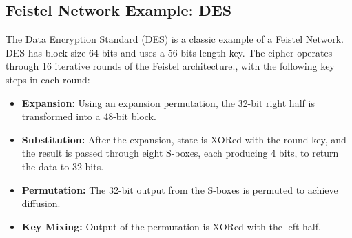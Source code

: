\subsection{Feistel Network Example: DES}
The Data Encryption Standard (DES) \cite{standard1999data} is a classic example of a Feistel Network. DES has block size 64 bits and uses a 56 bits length key. The cipher operates through 16 iterative rounds of the Feistel architecture., with the following key steps in each round:

\begin{itemize}
    \item \textbf{Expansion:} Using an expansion permutation, the 32-bit right half is transformed into a 48-bit block.
    \item \textbf{Substitution:} After the expansion, state is XORed with the round key, and the result is passed through eight S-boxes, each producing 4 bits, to return the data to 32 bits.
    \item \textbf{Permutation:} The 32-bit output from the S-boxes is permuted to achieve diffusion.
    \item \textbf{Key Mixing:} Output of the permutation is XORed with the left half.
\end{itemize}

